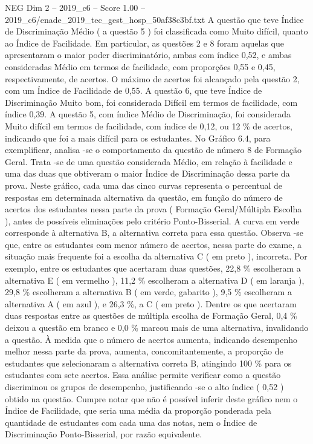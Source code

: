 \begin{textsample}{NEG Dim 2 – 2019\_c6 – Score 1.00 – 2019\_c6/enade\_2019\_tec\_gest\_hosp\_50af38c3bf.txt}
A questão que teve Índice de Discriminação Médio ( a questão 5 ) foi classificada como Muito difícil, quanto ao Índice de Facilidade.
Em particular, as questões 2 e 8 foram aquelas que apresentaram o maior poder discriminatório, ambas com índice 0,52, e ambas consideradas Médio em termos de facilidade, com proporções 0,55 e 0,45, respectivamente, de acertos.
O máximo de acertos foi alcançado pela questão 2, com um Índice de Facilidade de 0,55.
A questão 6, que teve Índice de Discriminação Muito bom, foi considerada Difícil em termos de facilidade, com índice 0,39.
A questão 5, com índice Médio de Discriminação, foi considerada Muito difícil em termos de facilidade, com índice de 0,12, ou 12 \% de acertos, indicando que foi a mais difícil para os estudantes.
No Gráfico 6.4, para exemplificar, analisa -se o comportamento da questão de número 8 de Formação Geral.
Trata -se de uma questão considerada Médio, em relação à facilidade e uma das duas que obtiveram o maior Índice de Discriminação dessa parte da prova.
Neste gráfico, cada uma das cinco curvas representa o percentual de respostas em determinada alternativa da questão, em função do número de acertos dos estudantes nessa parte da prova ( Formação Geral/Múltipla Escolha ), antes de possíveis eliminações pelo critério Ponto-Bisserial.
A curva em verde corresponde à alternativa B, a alternativa correta para essa questão.
Observa -se que, entre os estudantes com menor número de acertos, nessa parte do exame, a situação mais frequente foi a escolha da alternativa C ( em preto ), incorreta.
Por exemplo, entre os estudantes que acertaram duas questões, 22,8 \% escolheram a alternativa E ( em vermelho ), 11,2 \% escolheram a alternativa D ( em laranja ), 29,8 \% escolheram a alternativa B ( em verde, gabarito ), 9,5 \% escolheram a alternativa A ( em azul ), e 26,3 \%, a C ( em preto ).
Dentre os que acertaram duas respostas entre as questões de múltipla escolha de Formação Geral, 0,4 \% deixou a questão em branco e 0,0 \% marcou mais de uma alternativa, invalidando a questão.
À medida que o número de acertos aumenta, indicando desempenho melhor nessa parte da prova, aumenta, concomitantemente, a proporção de estudantes que selecionaram a alternativa correta B, atingindo 100 \% para os estudantes com sete acertos.
Essa análise permite verificar como a questão discriminou os grupos de desempenho, justificando -se o alto índice ( 0,52 ) obtido na questão.
Cumpre notar que não é possível inferir deste gráfico nem o Índice de Facilidade, que seria uma média da proporção ponderada pela quantidade de estudantes com cada uma das notas, nem o Índice de Discriminação Ponto-Bisserial, por razão equivalente.

\end{textsample}
